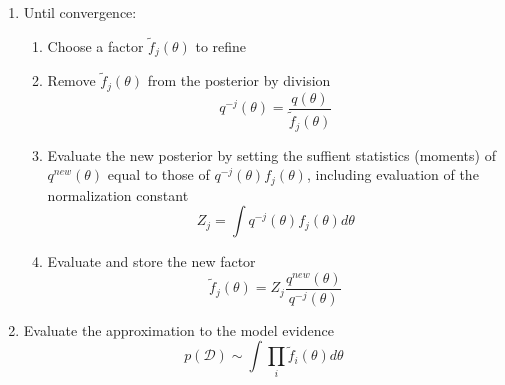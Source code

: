 \documentclass{beamer}
\newcounter{sauvegardeenumi}
\newcommand{\suite}{\setcounter{enumi}{\thesauvegardeenumi}}
\newcommand{\tf}{\tilde{f}}
\newcommand{\mD}{\mathcal{D}}
\begin{document}
\begin{frame}
    \begin{enumerate}
	    \suite
	\item Until convergence:
	    \begin{enumerate}
		\item Choose a factor $\tf_j(\theta)$ to refine
		\item Remove $\tf_j (\theta)$ from the posterior by division 
		    \begin{equation*}
			q^{-j}(\theta) = \frac{q(\theta)}{\tf_j(\theta)}
		    \end{equation*}
		\item Evaluate the new posterior by setting the suffient statistics (moments) of $q^{new}(\theta)$ equal to those of $q^{-j}(\theta)f_j(\theta)$, including evaluation of the normalization constant
		    \begin{equation*}
			Z_j = \int q^{-j}(\theta)f_j(\theta)d\theta
		    \end{equation*}
		\item Evaluate and store the new factor 
		    \begin{equation*}
			\tf_j(\theta) = Z_j \frac{q^{new}(\theta)}{q^{-j}(\theta)}
		    \end{equation*}
	    \end{enumerate}
	\item Evaluate the approximation to the model evidence
	    \begin{equation*}
		p(\mD) \sim \int \prod_i \tf_i(\theta)d\theta
	    \end{equation*}
    \end{enumerate}
\end{frame}
\end{document}
